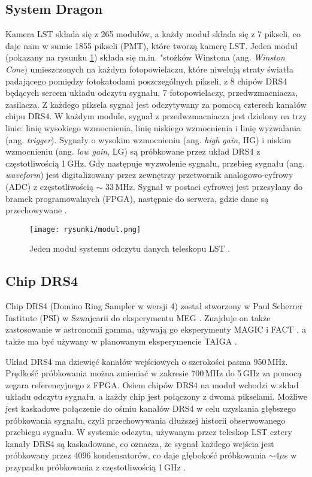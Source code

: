 \documentclass[a4paper,11pt,twoside]{article}
\begin{document}
\subsection{System Dragon}
Kamera LST składa się z 265 modułów, a każdy moduł składa się z 7 pikseli, co daje nam w sumie 1855 pikseli (PMT), które tworzą kamerę LST. Jeden moduł (pokazany na rysunku \ref{fig:drs4}) składa się m.in. "stożków Winstona (ang. \textsl{Winston Cone}) umieszczonych na każdym fotopowielaczu, które niwelują straty światła padającego pomiędzy fotokatodami poszczególnych pikseli, z 8 chipów DRS4 będących sercem układu odczytu sygnału, 7 fotopowielaczy, przedwzmacniacza, zasilacza.
Z każdego piksela sygnał jest odczytywany za pomocą czterech kanałów chipu DRS4. W każdym module, sygnał z przedwzmacniacza jest dzielony na trzy linie: linię wysokiego wzmocnienia, linię niskiego wzmocnienia i linię wyzwalania (ang. \textsl{trigger}). Sygnały o wysokim wzmocnieniu (ang. \textsl{high gain}, HG) i niskim wzmocnieniu (ang. \textsl{low gain}, LG) są próbkowane przez układ DRS4 z częstotliwością 1\,GHz. Gdy następuje wyzwolenie sygnału, przebieg sygnału (ang. \textsl{waveform}) jest digitalizowany przez zewnętrzy przetwornik analogowo-cyfrowy (ADC) z częstotliwością $\sim$ 33\,MHz. Sygnał w postaci cyfrowej jest przesyłany do bramek programowalnych (FPGA), następnie do serwera, gdzie dane są przechowywane \cite{dragon_lst}. 
\begin{figure}[H] 
\centering
\texttt{[image: rysunki/modul.png]}
\caption{Jeden moduł systemu odczytu danych teleskopu LST \cite{lst_report}.}
\label{fig:drs4}
\end{figure}
\subsection{Chip DRS4}
Chip DRS4 (Domino Ring Sampler w wersji 4) został stworzony w Paul Scherrer Institute (PSI) w Szwajcarii do eksperymentu MEG \cite{meg_experiment}.
Znajduje on także zastosowanie w astronomii gamma, używają go eksperymenty MAGIC \cite{magic_hardware} i FACT \cite{fact}, a także ma być używany w planowanym eksperymencie TAIGA \cite{tunka}.

Układ DRS4 ma dziewięć kanałów wejściowych o szerokości pasma 950\,MHz. Prędkość próbkowania można zmieniać w zakresie 700\,MHz do 5\,GHz za pomocą zegara referencyjnego z FPGA. Osiem chipów DRS4 na moduł wchodzi w skład układu odczytu sygnału, a każdy chip jest połączony z dwoma pikselami. Możliwe jest kaskadowe połączenie do ośmiu kanałów DRS4 w celu uzyskania głębszego próbkowania sygnału, czyli przechowywania dłuższej historii obserwowanego przebiegu sygnału. W systemie odczytu, używanym przez teleskop LST cztery kanały DRS4 są kaskadowane, co oznacza, że sygnał każdego wejścia jest próbkowany przez 4096 kondensatorów, co daje głębokość próbkowania $\sim 4 \mathtt{\mu}$s w przypadku próbkowania z częstotliwością 1\,GHz \cite{dragon_lst}.
\end{document}
